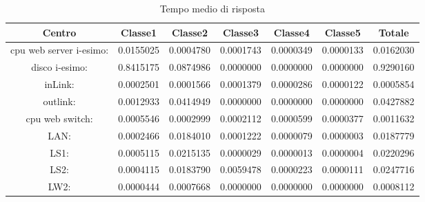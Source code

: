 \begin{table}[H]
\caption{Tempo medio di risposta}
\begin{center}\begin{scriptsize}
\begin{tabular}{||c|c|c|c|c|c|c||}
\hline
Centro &Classe1 &Classe2 &Classe3 &Classe4 &Classe5 &Totale\\
\hline
\hline
 cpu web server i-esimo: 	&0.0155025	&0.0004780	&0.0001743	&0.0000349	&0.0000133	&0.0162030\\
\hline
 disco i-esimo: 	&0.8415175	&0.0874986	&0.0000000	&0.0000000	&0.0000000	&0.9290160\\
\hline
 inLink: 	&0.0002501	&0.0001566	&0.0001379	&0.0000286	&0.0000122	&0.0005854\\
\hline
 outlink: 	&0.0012933	&0.0414949	&0.0000000	&0.0000000	&0.0000000	&0.0427882\\
\hline
 cpu web switch: 	&0.0005546	&0.0002999	&0.0002112	&0.0000599	&0.0000377	&0.0011632\\
\hline
 LAN: 	&0.0002466	&0.0184010	&0.0001222	&0.0000079	&0.0000003	&0.0187779\\
\hline
 LS1: 	&0.0005115	&0.0215135	&0.0000029	&0.0000013	&0.0000004	&0.0220296\\
\hline
 LS2: 	&0.0004115	&0.0183790	&0.0059478	&0.0000223	&0.0000111	&0.0247716\\
\hline
 LW2: 	&0.0000444	&0.0007668	&0.0000000	&0.0000000	&0.0000000	&0.0008112\\
\hline
\end{tabular}
\end{scriptsize}\end{center}
\label{tempomediorisposta}
\end{table}

